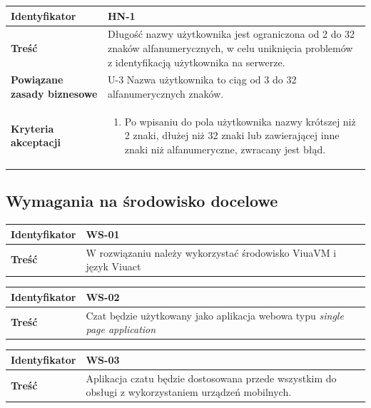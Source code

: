 \documentclass[11pt,oneside,a4paper,titlepage,onecolumn]{article}
\newenvironment{enumreq}
{ \begin{enumerate}[topsep=0pt,itemsep=-1ex,partopsep=1ex,parsep=1ex] }
{ \end{enumerate}                  }
\begin{document}
\begin{tabular}{ | l | l | }
	\hline
		\textbf{Identyfikator} & 
		HN-1
		\\
		
	\hline
		\textbf{Treść} & \parbox[t]{13cm}{
			Długość nazwy użytkownika jest ograniczona od 2 do 32 znaków alfanumerycznych, w celu uniknięcia problemów z identyfikacją użytkownika na serwerze.
		}\\
		 
	\hline
		\parbox[t]{4cm}{\textbf{Powiązane zasady biznesowe}} & \parbox[t]{13cm}{
			U-3 Nazwa użytkownika to ciąg od 3 do 32 alfanumerycznych znaków.
		}\\
		
	\hline
		\parbox[t]{4cm}{\textbf{Kryteria akceptacji}} & \parbox[t]{13cm}{
			\begin{enumreq}
				\item Po wpisaniu do pola użytkownika nazwy krótszej niż 2 znaki, dłużej niż 32 znaki lub zawierającej inne znaki niż alfanumeryczne, zwracany jest błąd.
			\end{enumreq}
			}
		\\

	\hline
\end{tabular}

\subsection{Wymagania na środowisko docelowe}

\begin{tabular}{ | l | l | }
	\hline
		\textbf{Identyfikator} & 
	WS-01
		\\
		
	\hline
		\textbf{Treść} & \parbox[t]{13cm}{
			W rozwiązaniu należy wykorzystać środowisko ViuaVM i
			język Viuact
		}\\

	\hline
\end{tabular}

\begin{tabular}{ | l | l | }
	\hline
		\textbf{Identyfikator} & 
	WS-02
		\\
		
	\hline
		\textbf{Treść} & \parbox[t]{13cm}{
			Czat będzie użytkowany jako aplikacja webowa typu
			\textit{single page application}
		}\\

	\hline
\end{tabular}

\begin{tabular}{ | l | l | }
	\hline
		\textbf{Identyfikator} & 
	WS-03
		\\
		
	\hline
		\textbf{Treść} & \parbox[t]{13cm}{
			Aplikacja czatu będzie dostosowana przede wszystkim
			do obsługi z wykorzystaniem urządzeń mobilnych.
		}\\

	\hline
\end{tabular}
\end{document}
